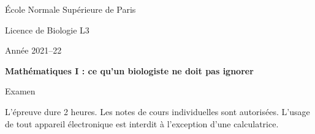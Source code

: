 \documentclass[french, 12pt]{article}
\title{}
\begin{document}

\begin{centering}
  \footnotesize{\sc École Normale Supérieure de Paris} 
  
  \bigskip
  \footnotesize{\sc Licence de Biologie L3}
  
  \bigskip
  \footnotesize{\sc Année 2021–22}
  
  \bigskip
  {\bf Mathématiques I : ce qu’un biologiste ne doit pas ignorer} 
  
  \bigskip
  {\sc Examen}
  
\end{centering}

\bigskip
L'épreuve dure 2 heures. 
Les notes de cours individuelles sont autorisées.
L’usage de tout appareil électronique est interdit à l’exception d’une calculatrice.



\newpage


\end{document}
